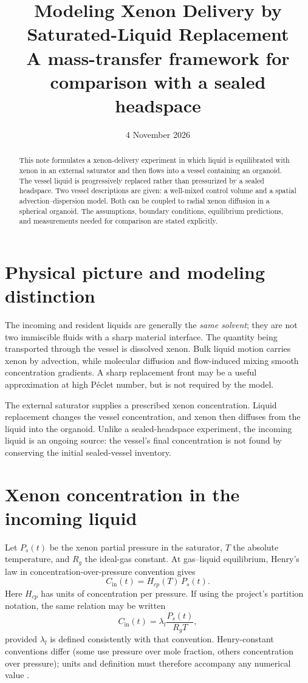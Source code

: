 \documentclass[11pt]{article}
\title{\textbf{Modeling Xenon Delivery by Saturated-Liquid Replacement}\\
\large A mass-transfer framework for comparison with a sealed headspace}
\date{4 November 2026}
\begin{document}
\maketitle

\begin{abstract}
This note formulates a xenon-delivery experiment in which liquid is
equilibrated with xenon in an external saturator and then flows into a vessel
containing an organoid. The vessel liquid is progressively replaced rather
than pressurized by a sealed headspace. Two vessel descriptions are given:
a well-mixed control volume and a spatial advection--dispersion model. Both
can be coupled to radial xenon diffusion in a spherical organoid. The
assumptions, boundary conditions, equilibrium predictions, and measurements
needed for comparison are stated explicitly.
\end{abstract}

\section{Physical picture and modeling distinction}

The incoming and resident liquids are generally the \emph{same solvent};
they are not two immiscible fluids with a sharp material interface. The
quantity being transported through the vessel is dissolved xenon. Bulk liquid
motion carries xenon by advection, while molecular diffusion and
flow-induced mixing smooth concentration gradients. A sharp replacement
front may be a useful approximation at high P\'eclet number, but is not
required by the model.

The external saturator supplies a prescribed xenon concentration. Liquid
replacement changes the vessel concentration, and xenon then diffuses from
the liquid into the organoid. Unlike a sealed-headspace experiment, the
incoming liquid is an ongoing source: the vessel's final concentration is
not found by conserving the initial sealed-vessel inventory.

\section{Xenon concentration in the incoming liquid}

Let \(P_s(t)\) be the xenon partial pressure in the saturator, \(T\) the
absolute temperature, and \(R_g\) the ideal-gas constant. At gas--liquid
equilibrium, Henry's law in concentration-over-pressure convention gives
\begin{equation}
  C_{\mathrm{in}}(t) = H_{cp}(T)\,P_s(t).
  \label{eq:henry}
\end{equation}
Here \(H_{cp}\) has units of concentration per pressure. If using the
project's partition notation, the same relation may be written
\begin{equation}
  C_{\mathrm{in}}(t) =
  \lambda_l \frac{P_s(t)}{R_gT},
  \label{eq:project-henry}
\end{equation}
provided \(\lambda_l\) is defined consistently with that convention.
Henry-constant conventions differ (some use pressure over mole fraction,
others concentration over pressure); units and definition must therefore
accompany any numerical value \cite{IUPACHenry,Sander2023}.
\end{document}
